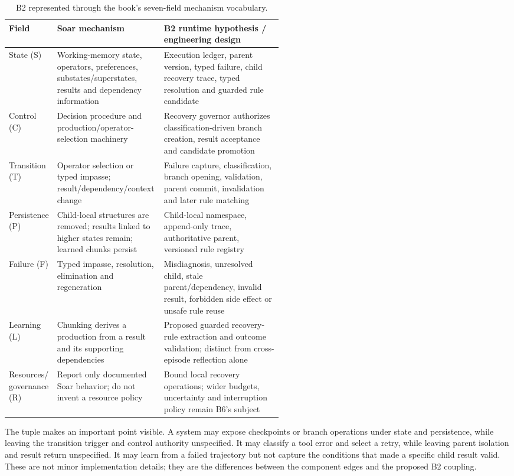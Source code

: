 \begin{table}[tbp]
\centering
\small
\caption{B2 represented through the book's seven-field mechanism vocabulary.}
\label{tab:ch13-seven-fields}
\begin{tabularx}{\linewidth}{@{}p{0.15\linewidth}p{0.39\linewidth}X@{}}
\toprule
\textbf{Field} & \textbf{Soar mechanism} & \textbf{B2 runtime hypothesis / engineering design} \\
\midrule
State (S) & Working-memory state, operators, preferences, substates/superstates, results and dependency information & Execution ledger, parent version, typed failure, child recovery trace, typed resolution and guarded rule candidate \\
Control (C) & Decision procedure and production/operator-selection machinery & Recovery governor authorizes classification-driven branch creation, result acceptance and candidate promotion \\
Transition (T) & Operator selection or typed impasse; result/dependency/context change & Failure capture, classification, branch opening, validation, parent commit, invalidation and later rule matching \\
Persistence (P) & Child-local structures are removed; results linked to higher states remain; learned chunks persist & Child-local namespace, append-only trace, authoritative parent, versioned rule registry \\
Failure (F) & Typed impasse, resolution, elimination and regeneration & Misdiagnosis, unresolved child, stale parent/dependency, invalid result, forbidden side effect or unsafe rule reuse \\
Learning (L) & Chunking derives a production from a result and its supporting dependencies & Proposed guarded recovery-rule extraction and outcome validation; distinct from cross-episode reflection alone \\
\shortstack[l]{Resources/\\governance (R)} & Report only documented Soar behavior; do not invent a resource policy & Bound local recovery operations; wider budgets, uncertainty and interruption policy remain B6's subject \\
\bottomrule
\end{tabularx}
\end{table}

The tuple makes an important point visible. A system may expose checkpoints or branch operations under state and persistence, while leaving the transition trigger and control authority unspecified. It may classify a tool error and select a retry, while leaving parent isolation and result return unspecified. It may learn from a failed trajectory but not capture the conditions that made a specific child result valid. These are not minor implementation details; they are the differences between the component edges and the proposed B2 coupling.


